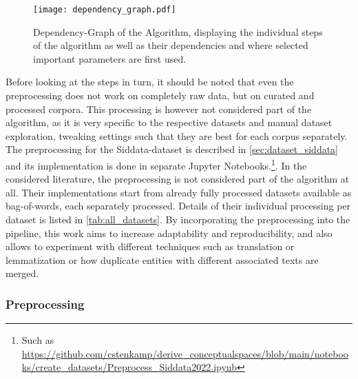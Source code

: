 \begin{figure}[H]
	\begin{center}
	  \texttt{[image: dependency\_graph.pdf]}
	  \caption[Dependency-Graph of the Algorithm]{Dependency-Graph of the Algorithm, displaying the individual steps of the algorithm as well as their dependencies and where selected important parameters are first used. }
	  \label{fig:dependency_graph}
	\end{center}
\end{figure}


Before looking at the steps in turn, it should be noted that even the preprocessing does not work on completely raw data, but on curated and processed corpora. This processing is however not considered part of the algorithm, as it is very specific to the respective datasets and manual dataset exploration, tweaking settings such that they are best for each corpus separately. The preprocessing for the Siddata-dataset is described in \autoref{sec:dataset_siddata} and its implementation is done in separate Jupyter Notebooks.\footnote{Such as \url{https://github.com/cstenkamp/derive_conceptualspaces/blob/main/notebooks/create_datasets/Preprocess_Siddata2022.ipynb}}. In the considered literature, the preprocessing is not considered part of the algorithm at all. Their implementations start from already fully processed datasets available as bag-of-words, each separately processed. Details of their individual processing per dataset is listed in \autoref{tab:all_datasets}. By incorporating the preprocessing into the pipeline, this work aims to increase adaptability and reproducibility, and also allows to experiment with different techniques such as translation or lemmatization or how duplicate entities with different associated texts are merged.

\subsubsection{Preprocessing}

\label{sec:algo_preproc}


